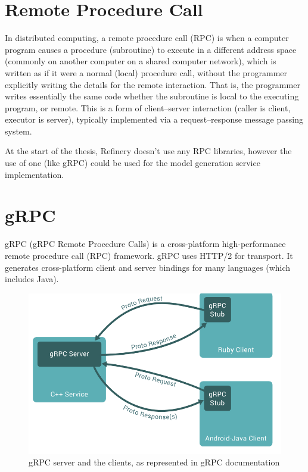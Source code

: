 \section{Remote Procedure Call} \label{backgrpc}
	In distributed computing, a remote procedure call (RPC) \cite{rpc} is when a computer program causes a procedure (subroutine) to execute in a different address space 
	(commonly on another computer on a shared computer network), which is written as if it were a normal (local) procedure call, without the programmer 
	explicitly writing the details for the remote interaction. That is, the programmer writes essentially the same code whether the subroutine is local to 
	the executing program, or remote.
	This is a form of client–server interaction (caller is client, executor is server), typically implemented via a request–response message passing system.

	At the start of the thesis, Refinery doesn't use any RPC libraries, however the use of one (like gRPC) could be used for the model generation service implementation.

\section{gRPC} \label{backgrgrpc}
	gRPC (gRPC Remote Procedure Calls) \cite{grpcwiki} is a cross-platform high-performance remote procedure call (RPC) framework. 
	gRPC uses HTTP/2 for transport.	It generates cross-platform client and server bindings for many languages (which includes Java). 

	\begin{figure}[h!]
		\begin{center}
			\includegraphics[scale=0.8]{include/imgs/grpc_works.PNG}	
		\end{center}
		\caption{gRPC server and the clients, as represented in gRPC documentation \cite{grpcspec}}
	\end{figure}

